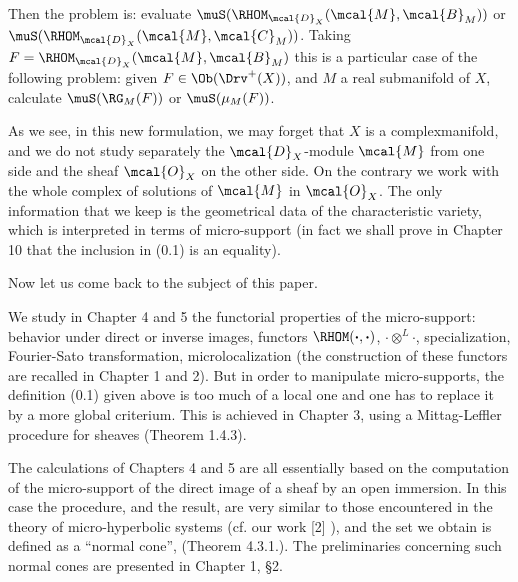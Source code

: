Then the problem is: 
evaluate $\muS(\RHOM_{\mcal{D}_X}(\mcal{M},\mcal{B}_M))$ or
\linebreak[4]
$\muS(\RHOM_{\mcal{D}_X}(\mcal{M},\mcal{C}_M))$. 
Taking $F = \RHOM_{\mcal{D}_X}(\mcal{M},\mcal{B}_M)$ 
this is a particular case of the following problem: 
given $F \in \Ob(\Drv^+(X))$, and $M$ a real submanifold of $X$, 
calculate $\muS (\RG_M(F))$ or $\muS(\mu_M(F))$.

As we see, in this new formulation, we may forget that $X$ is a
complexmanifold, and we do not study separately 
the $\mcal{D}_X$-module $\mcal{M}$ from one side 
and the sheaf $\mcal{O}_X$ on the other side. 
On the contrary 
we work with the whole complex of solutions of $\mcal{M}$ in $\mcal{O}_X$. 
The only information that we keep is 
the geometrical data of the characteristic variety, 
which is interpreted in terms of micro-support (in fact
we shall prove in Chapter 10 that the inclusion in (0.1) is an
equality). 

Now let us come back to the subject of this paper.

We study in Chapter 4 and 5 
the functorial properties of the micro-support: 
behavior under direct or inverse images, functors
$\RHOM(\boldsymbol{\cdot},\boldsymbol{\cdot})$, $\boldsymbol{\cdot}\otimes^{L}\boldsymbol{\cdot}$, 
specialization, Fourier-Sato transformation, 
microlocalization (the construction of 
these functors are recalled in Chapter 1 and 2). 
But in order to manipulate micro-supports, 
the definition (0.1) given above is too much 
of a local one and one has to replace it 
by a more global criterium. 
This is achieved in Chapter 3, 
using a Mittag-Leffler procedure for sheaves (Theorem 1.4.3).

The calculations of Chapters 4 and 5 are 
all essentially based on
the computation of the micro-support of the direct image 
of a sheaf by an open immersion. 
In this case the procedure, and the result,
are very similar to those encountered in the theory 
of micro-hyperbolic systems (cf. our work [2] ), 
and the set we obtain is defined as a ``normal cone'', 
(Theorem 4.3.1.). 
The preliminaries concerning such normal cones 
are presented in Chapter 1, \S2.

